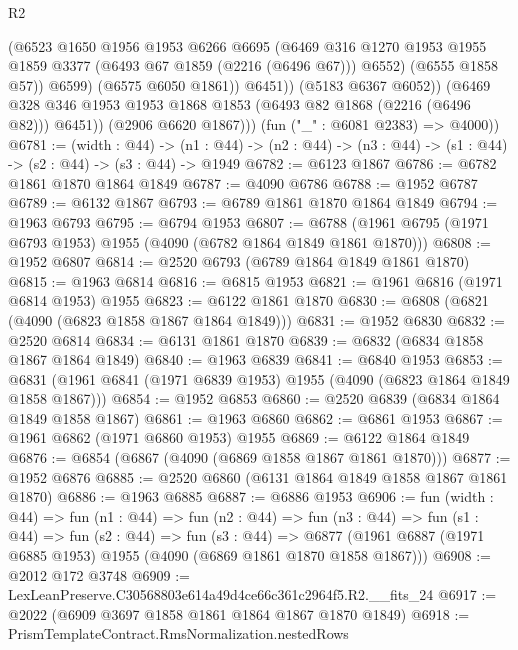 \begin{lexlean}{R2}
\begin{coremodule}
                      (@6523
                        @1650
                        @1956
                        @1953
                        @6266
                        @6695
                        (@6469
                          @316
                          @1270
                          @1953
                          @1955
                          @1859
                          @3377
                          (@6493 @67 @1859 (@2216 (@6496 @67)))
                          @6552)
                        (@6555 @1858 @57))
                      @6599)
                    (@6575 @6050 @1861))
                  @6451))
              (@5183 @6367 @6052))
            (@6469 @328 @346 @1953 @1953 @1868 @1853 (@6493 @82 @1868 (@2216 (@6496 @82))) @6451))
          (@2906 @6620 @1867)))
      (fun ("_" : @6081 @2383) => @4000))
@6781 := (width : @44) ->
  (n1 : @44) -> (n2 : @44) -> (n3 : @44) -> (s1 : @44) -> (s2 : @44) -> (s3 : @44) -> @1949
@6782 := @6123 @1867
@6786 := @6782 @1861 @1870 @1864 @1849
@6787 := @4090 @6786
@6788 := @1952 @6787
@6789 := @6132 @1867
@6793 := @6789 @1861 @1870 @1864 @1849
@6794 := @1963 @6793
@6795 := @6794 @1953
@6807 := @6788 (@1961 @6795 (@1971 @6793 @1953) @1955 (@4090 (@6782 @1864 @1849 @1861 @1870)))
@6808 := @1952 @6807
@6814 := @2520 @6793 (@6789 @1864 @1849 @1861 @1870)
@6815 := @1963 @6814
@6816 := @6815 @1953
@6821 := @1961 @6816 (@1971 @6814 @1953) @1955
@6823 := @6122 @1861 @1870
@6830 := @6808 (@6821 (@4090 (@6823 @1858 @1867 @1864 @1849)))
@6831 := @1952 @6830
@6832 := @2520 @6814
@6834 := @6131 @1861 @1870
@6839 := @6832 (@6834 @1858 @1867 @1864 @1849)
@6840 := @1963 @6839
@6841 := @6840 @1953
@6853 := @6831 (@1961 @6841 (@1971 @6839 @1953) @1955 (@4090 (@6823 @1864 @1849 @1858 @1867)))
@6854 := @1952 @6853
@6860 := @2520 @6839 (@6834 @1864 @1849 @1858 @1867)
@6861 := @1963 @6860
@6862 := @6861 @1953
@6867 := @1961 @6862 (@1971 @6860 @1953) @1955
@6869 := @6122 @1864 @1849
@6876 := @6854 (@6867 (@4090 (@6869 @1858 @1867 @1861 @1870)))
@6877 := @1952 @6876
@6885 := @2520 @6860 (@6131 @1864 @1849 @1858 @1867 @1861 @1870)
@6886 := @1963 @6885
@6887 := @6886 @1953
@6906 := fun (width : @44) =>
  fun (n1 : @44) =>
  fun (n2 : @44) =>
  fun (n3 : @44) =>
  fun (s1 : @44) =>
  fun (s2 : @44) =>
  fun (s3 : @44) =>
  @6877 (@1961 @6887 (@1971 @6885 @1953) @1955 (@4090 (@6869 @1861 @1870 @1858 @1867)))
@6908 := @2012 @172 @3748
@6909 := LexLeanPreserve.C30568803e614a49d4ce66c361c2964f5.R2.__fits_24
@6917 := @2022 (@6909 @3697 @1858 @1861 @1864 @1867 @1870 @1849)
@6918 := PrismTemplateContract.RmsNormalization.nestedRows

\end{coremodule}
\end{lexlean}
